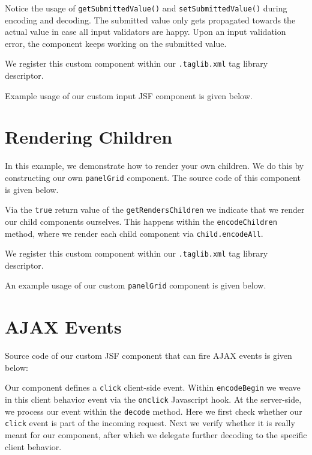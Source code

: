 Notice the usage of \texttt{getSubmittedValue()} and \texttt{setSubmittedValue()} during encoding and decoding.
The submitted value only gets propagated towards the actual value in case all input validators are happy.
Upon an input validation error, the component keeps working on the submitted value.

We register this custom component within our \texttt{.taglib.xml} tag library descriptor.


Example usage of our custom input JSF component is given below.


\section{Rendering Children}
In this example, we demonstrate how to render your own children.
We do this by constructing our own \texttt{panelGrid} component.
The source code of this component is given below.

Via the \texttt{true} return value of the \texttt{getRendersChildren} we indicate that we render our child components ourselves.
This happens within the \texttt{encodeChildren} method, where we render each child component via \texttt{child.encodeAll}.

We register this custom component within our \texttt{.taglib.xml} tag library descriptor.


An example usage of our custom \texttt{panelGrid} component is given below.



\section{AJAX Events}

Source code of our custom JSF component that can fire AJAX events is given below:

Our component defines a \texttt{click} client-side event.
Within \texttt{encodeBegin} we weave in this client behavior event via the \texttt{onclick} Javascript hook.
At the server-side, we process our event within the \texttt{decode} method.
Here we first check whether our \texttt{click} event is part of the incoming request.
Next we verify whether it is really meant for our component, after which we delegate further decoding to the specific client behavior.

